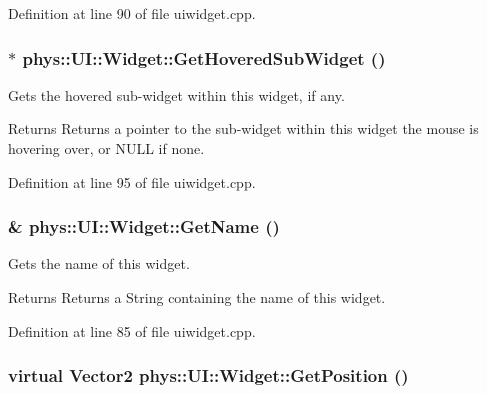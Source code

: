 Definition at line 90 of file uiwidget.cpp.

\hypertarget{classphys_1_1UI_1_1Widget_a38764b73bc6087e2611660735840ba3f}{
\subsubsection[{GetHoveredSubWidget}]{ $\ast$ phys::UI::Widget::GetHoveredSubWidget ()}}
\label{d9/d48/classphys_1_1UI_1_1Widget_a38764b73bc6087e2611660735840ba3f}


Gets the hovered sub-\/widget within this widget, if any. 

\begin{DoxyReturn}{Returns}
Returns a pointer to the sub-\/widget within this widget the mouse is hovering over, or NULL if none. 
\end{DoxyReturn}


Definition at line 95 of file uiwidget.cpp.

\hypertarget{classphys_1_1UI_1_1Widget_a35d6e7ce60a9b295d8659345627cf7e0}{
\subsubsection[{GetName}]{ \& phys::UI::Widget::GetName ()}}
\label{d9/d48/classphys_1_1UI_1_1Widget_a35d6e7ce60a9b295d8659345627cf7e0}


Gets the name of this widget. 

\begin{DoxyReturn}{Returns}
Returns a String containing the name of this widget. 
\end{DoxyReturn}


Definition at line 85 of file uiwidget.cpp.

\hypertarget{classphys_1_1UI_1_1Widget_a3e464b028b0d1b5755923b8790260c33}{
\subsubsection[{GetPosition}]{\setlength{\rightskip}{0pt plus 5cm}virtual {\bf Vector2} phys::UI::Widget::GetPosition ()}}
\label{d9/d48/classphys_1_1UI_1_1Widget_a3e464b028b0d1b5755923b8790260c33}


